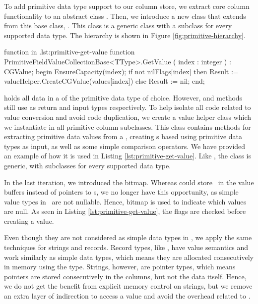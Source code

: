 To add primitive data type support to our column store, we extract core column functionality to an abstract class . Then, we introduce a new class that extends from this base class, . This class is a generic class with a subclass for every supported data type. The hierarchy is shown in Figure \ref{fig:primitive-hierarchy}.

\begin{delphicode}{ function in .}{lst:primitive-get-value}
function PrimitiveFieldValueCollectionBase<TType>.GetValue
( index : integer )
: CGValue;
begin
  EnsureCapacity(index);
  if not nilFlags[index] then
    Result := valueHelper.CreateCGValue(values[index])
  else
    Result := nil;
end;
\end{delphicode}

 holds all data in a  of the primitive data type of choice. However,  and  methods still use  as return and input types respectively. To help isolate all code related to value conversion and avoid code duplication, we create a value helper class which we instantiate in all primitive column subclasses. This class contains methods for extracting primitive data values from a , creating s based using primitive data types as input, as well as some simple comparison operators. We have provided an example of how it is used in Listing \ref{lst:primitive-get-value}. Like , the class is generic, with subclasses for every supported data type.

In the last iteration, we introduced the  bitmap. Whereas  could store \nil~in the value buffers instead of pointers to s, we no longer have this opportunity, as simple value types in \delphi~are not nullable. Hence,  bitmap is used to indicate which values are null. As seen in Listing \ref{lst:primitive-get-value}, the flags are checked before creating a value.

Even though they are not considered as simple data types in \delphi, we apply the same techniques for strings and records. Record types, like , have value semantics and work similarly as simple data types, which means they are allocated consecutively in memory using the  type. Strings, however, are pointer types, which means pointers are stored consecutively in the columns, but not the data itself. Hence, we do not get the benefit from explicit memory control on strings, but we remove an extra layer of indirection to access a value and avoid the overhead related to .

